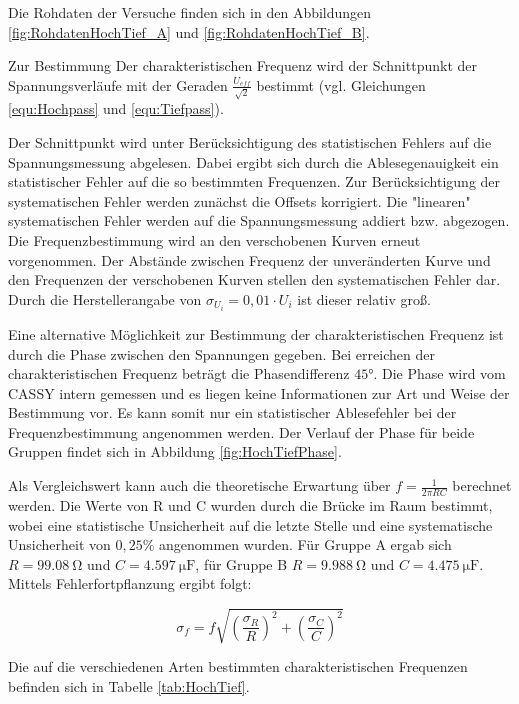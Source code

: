 \documentclass[12pt,a4paper]{article}
\begin{document}
Die Rohdaten der Versuche finden sich in den Abbildungen \ref{fig:RohdatenHochTief_A} und \ref{fig:RohdatenHochTief_B}.

Zur Bestimmung Der charakteristischen Frequenz wird der Schnittpunkt der Spannungsverläufe mit der Geraden $\frac{U_{eff}}{\sqrt{2}}$ bestimmt (vgl. Gleichungen \ref{equ:Hochpass} und \ref{equ:Tiefpass}).

Der Schnittpunkt wird unter Berücksichtigung des statistischen Fehlers auf die Spannungsmessung abgelesen. Dabei ergibt sich durch die Ablesegenauigkeit ein statistischer Fehler auf die so bestimmten Frequenzen.
Zur Berücksichtigung der systematischen Fehler werden zunächst die Offsets korrigiert. Die "linearen" systematischen Fehler werden auf die Spannungsmessung addiert bzw. abgezogen. 
Die Frequenzbestimmung wird an den verschobenen Kurven erneut vorgenommen. Der Abstände zwischen Frequenz der unveränderten Kurve und den Frequenzen der verschobenen Kurven stellen den systematischen Fehler dar. Durch die Herstellerangabe von $\sigma_{U_i} = 0,01 \cdot U_i$ ist dieser relativ groß.

Eine alternative Möglichkeit zur Bestimmung der charakteristischen Frequenz ist durch die Phase zwischen den Spannungen gegeben. Bei erreichen der charakteristischen Frequenz beträgt die Phasendifferenz $\ang{45}$. Die Phase wird vom CASSY intern gemessen und es liegen keine Informationen zur Art und Weise der Bestimmung vor. Es kann somit nur ein statistischer Ablesefehler bei der Frequenzbestimmung angenommen werden. Der Verlauf der Phase für beide Gruppen findet sich in Abbildung \ref{fig:HochTiefPhase}.

Als Vergleichswert kann auch die theoretische Erwartung über $f = \frac{1}{2\pi RC}$ berechnet werden. Die Werte von R und C wurden durch die Brücke im Raum bestimmt, wobei eine statistische Unsicherheit auf die letzte Stelle und eine systematische Unsicherheit von $0,25$\% angenommen wurden. Für Gruppe A ergab sich $R=\SI{99,08}{\ohm}$ und $C=\SI{4,597}{\micro \F}$, für Gruppe B $R=\SI{9,988}{\ohm}$ und $C=\SI{4,475}{\micro \F}$. Mittels Fehlerfortpflanzung ergibt folgt:

\begin{equation}
\sigma_f = f \sqrt{\left( \frac{\sigma_R}{R} \right)^2+\left( \frac{\sigma_C}{C} \right)^2}
\end{equation}

Die auf die verschiedenen Arten bestimmten charakteristischen Frequenzen befinden sich in Tabelle \ref{tab:HochTief}.
\end{document}
